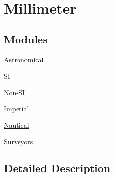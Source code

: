 \hypertarget{group___e_g_x_math-_conversions-_length_conversions-_millimeter}{}\section{Millimeter}
\label{group___e_g_x_math-_conversions-_length_conversions-_millimeter}
\subsection*{Modules}
\begin{DoxyCompactItemize}
\item 
\mbox{\hyperlink{group___e_g_x_math-_conversions-_length_conversions-_millimeter-_astronomical}{Astronomical}}
\item 
\mbox{\hyperlink{group___e_g_x_math-_conversions-_length_conversions-_millimeter-_s_i}{SI}}
\item 
\mbox{\hyperlink{group___e_g_x_math-_conversions-_length_conversions-_millimeter-_non-_s_i}{Non-\/\+SI}}
\item 
\mbox{\hyperlink{group___e_g_x_math-_conversions-_length_conversions-_millimeter-_imperial}{Imperial}}
\item 
\mbox{\hyperlink{group___e_g_x_math-_conversions-_length_conversions-_millimeter-_nautical}{Nautical}}
\item 
\mbox{\hyperlink{group___e_g_x_math-_conversions-_length_conversions-_millimeter-_surveyors}{Surveyors}}
\end{DoxyCompactItemize}


\subsection{Detailed Description}
